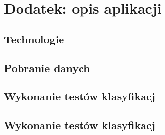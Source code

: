 \documentclass[a4paper, twoside, 11pt, openright]{article}
\begin{document}
\listoffigures
 
\listoftables

\section{Dodatek: opis aplikacji}

\subsection{Technologie}

\subsection{Pobranie danych}

\subsection{Wykonanie testów klasyfikacj}

\subsection{Wykonanie testów klasyfikacj}
\end{document}
